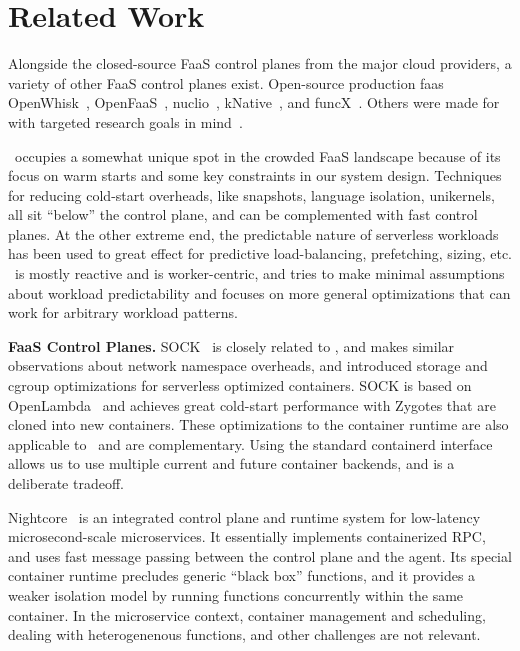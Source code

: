\section{Related Work}
\label{sec:related}

Alongside the closed-source FaaS control planes from the major cloud providers, a variety of other FaaS control planes exist.
Open-source production faas OpenWhisk~\cite{openwhisk}, OpenFaaS~\cite{openfaas}, nuclio~\cite{nuclio}, kNative~\cite{knative}, and funcX~\cite{funcx_hpdc_20}.
Others were made for with targeted research goals in mind~\cite{jia2021nightcore, hendrickson2016serverless, oakes_sock_2018, singhvi2021atoll,vhive-asplos21}.

\sysname~occupies a somewhat unique spot in the crowded FaaS landscape because of its focus on warm starts and some key constraints in our system design.
%
Techniques for reducing cold-start overheads, like snapshots, language isolation,  unikernels, all sit ``below'' the control plane, and can be complemented with fast control planes.
At the other extreme end, the predictable nature of serverless workloads has been used to great effect for predictive load-balancing, prefetching, sizing, etc.
\sysname~is mostly reactive and is worker-centric, and tries to make minimal assumptions about workload predictability and focuses on more general optimizations that can work for arbitrary workload patterns.
%

\noindent \textbf{FaaS Control Planes.}
%
SOCK~\cite{oakes_sock_2018} is closely related to \sysname, and makes similar observations about network namespace overheads, and introduced storage and cgroup optimizations for serverless optimized containers. 
SOCK is based on OpenLambda~\cite{hendrickson2016serverless} and achieves great cold-start performance with Zygotes that are cloned into new containers.
These optimizations to the container runtime are also applicable to \sysname~and are complementary. 
Using the standard containerd interface allows us to use multiple current and future container backends, and is a deliberate tradeoff. 


Nightcore~\cite{jia2021nightcore} is an integrated control plane and runtime system for low-latency microsecond-scale microservices.
It essentially implements containerized RPC, and uses fast message passing between the control plane and the agent.
Its special container runtime precludes generic ``black box'' functions, and it provides a weaker isolation model by running functions concurrently within the same container.
In the microservice context, container management and scheduling, dealing with heterogenenous functions, and other challenges are not relevant.


